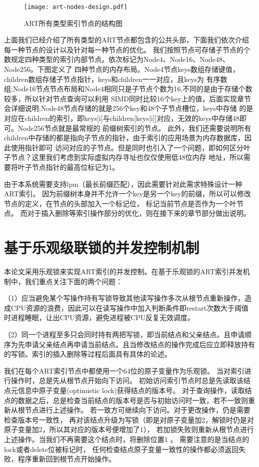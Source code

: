 \begin{figure}[h]
  \centering
  \texttt{[image: art-nodes-design.pdf]}
  \caption{ART所有类型索引节点的结构图}
  \label{fig:art-nodes-design}
\end{figure}

上面我们已经介绍了所有类型的ART节点都包含的公共头部，下面我们依次介绍每一种节点的设计以及针对每一种节点的优化。
我们按照节点可存储子节点的个数规定四种类型的索引内部节点。依次标记为Node4、Node16、Node48、Node256。下图定义了
四种节点的内存布局。Node4节点keys数组存储键值，children数组存储子节点指针，keys和children一一对应，且keys为
有序数组;Node16节点节点布局和Node4相同只是子节点个数为16,不同的是由于存储个数较多，所以针对节点查询可以利用
SIMD同时比较16个key上的值，后面实现章节会详细说明;Node48节点存储的就是256个key和48个子节点槽位，keys中存储
的是对应在children的索引，即keys[i]与children[keys[i]]对应，无效的keys中存储48即可。Node256节点就是最常规的
前缀树索引的节点。
此外，我们还需要说明所有children中存储的都是指向子节点的指针，由于索引的应用场景为内存数据库，因此使用指针即可
访问对应的子节点。但是同时也引入了一个问题，即如何区分叶子节点？这里我们考虑到实际虚拟内存寻址也仅仅使用低48位内存
地址，所以需要将叶子节点指针的最高位标记为1。

由于本系统需要支持lpm（最长前缀匹配），因此需要针对此需求特殊设计一种ART索引。
因为前缀树本身并不允许一个key是另一个key的前缀，所以可以修改节点的定义，在节点的头部加入一个标记位，
标记当前节点是否作为一个叶节点。
而对于插入删除等索引操作部分的优化，则在接下来的章节部分做出说明。

\section{基于乐观级联锁的并发控制机制}
本论文采用乐观锁来实现ART索引的并发控制。在基于乐观锁的ART索引并发机制中，我们重点关注下面的两个问题：

（1）应当避免某个写操作持有写锁导致其他读写操作多次从根节点重新操作，造成CPU资源的浪费，因此可以在读写操作中加入判断条件即restart次数大于阈值时进程睡眠，让出CPU资源，避免进程被CPU反复无效调度。

（2）同一个进程至多只会同时持有两把写锁，即当前结点和父亲结点。且申请顺序为先申请父亲结点再申请当前结点。且当修改结点的操作完成后应立即释放持有的写锁。索引的插入删除等过程后面具有具体的论述。

我们在每个ART索引节点中都使用一个64位的原子变量作为乐观锁。
当对索引进行操作时，总是先从根节点开始向下访问。
初始访问索引节点时总是先读取该结点元信息中原子变量(optimistic lock)获得结点的版本号。
对于查询操作，读取结点的数据之后，总是检查当前结点的版本号是否与初始访问时一致，若不一致则重新从根节点进行上述操作。
若一致方可继续向下访问。对于更改操作，仍是需要检查版本号一致性，
再对该结点升级为写锁（即是对原子变量加2，解锁时仍是对原子变量加2，所以其对应的版本号便增加了1），
若加锁失败则重新从根节点进行上述操作。当我们不再需要这个结点时，将删除位置1 。
需要注意的是当结点的lock或者delete位被标记时，
任何检查结点原子变量一致性的操作都必须返回失败，程序重新回到根节点开始操作。

